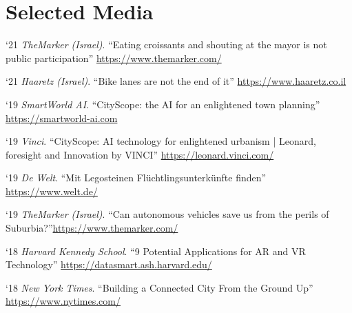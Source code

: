 \section*{Selected Media}
\begin{tablist}

    \item[`21] \tab \textit{TheMarker (Israel)}. \enquote{Eating croissants and shouting at the mayor is not public participation}
    \href{https://www.themarker.com/realestate/.premium-1.9490242}{https://www.themarker.com/}

    \item[`21] \tab \textit{Haaretz (Israel)}. \enquote{Bike lanes are not the end of it}
    \href{https://www.haaretz.co.il/magazine/.premium.HIGHLIGHT-MAGAZINE-1.10002361}{https://www.haaretz.co.il}

    \item[`19] \tab \textit{SmartWorld AI}. \enquote{CityScope: the AI for an enlightened town planning}
    \href{https://smartworld-ai.com/cityscope-the-ai-for-an-enlightened-town-planning/}{https://smartworld-ai.com}

    \item[`19] \tab \textit{Vinci}. \enquote{CityScope: AI technology for enlightened urbanism | Leonard, foresight and Innovation by VINCI}
    \href{https://leonard.vinci.com/en/cityscope-ai-technology-for-enlightened-urbanism/}{https://leonard.vinci.com/}

    \item[`19] \tab \textit{De Welt}. \enquote{Mit Legosteinen Flüchtlingsunterkünfte finden}
    \href{https://www.welt.de/regionales/hamburg/article152836431/Mit-Legosteinen-Fluechtlingsunterkuenfte-finden.html}{https://www.welt.de/}

    \item[`19] \tab \textit{TheMarker (Israel)}. \enquote{Can autonomous vehicles save us from the perils of Suburbia?}\href{https://www.themarker.com/magazine/.premium-MAGAZINE-1.6985623}{https://www.themarker.com/}

    \item[`18] \tab \textit{Harvard Kennedy School}. \enquote{9 Potential Applications for AR and VR Technology}
    \href{https://datasmart.ash.harvard.edu/news/article/9-potential-applications-ar-and-vr-technology}{https://datasmart.ash.harvard.edu/}

    \item[`18] \tab \textit{New York Times}. \enquote{Building a Connected City From the Ground Up}
    \href{https://www.nytimes.com/2018/04/03/business/smart-city.html}{https://www.nytimes.com/}


\end{tablist}
